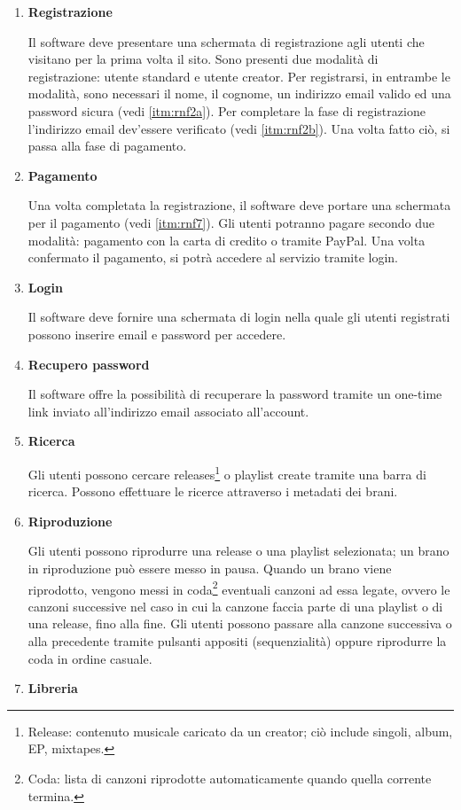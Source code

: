 \documentclass[a4paper,12pt]{article}
\begin{document}
\begin{enumerate}[label=\textbf{RF\arabic*}\;, ref=\textbf{RF\arabic*}]
    \item \label{itm:rf1} \textbf{Registrazione}
    
    Il software deve presentare una schermata di registrazione agli utenti che visitano per la prima volta il sito. Sono presenti due modalità di registrazione: utente standard e utente creator. Per registrarsi, in entrambe le modalità, sono necessari il nome, il cognome, un indirizzo email valido ed una password sicura (vedi \ref{itm:rnf2a}). Per completare la fase di registrazione l'indirizzo email dev'essere verificato (vedi \ref{itm:rnf2b}). Una volta fatto ciò, si passa alla fase di pagamento.
    \item \label{itm:rf2} \textbf{Pagamento}
    
    Una volta completata la registrazione, il software deve portare una schermata per il pagamento (vedi \ref{itm:rnf7}). Gli utenti potranno pagare secondo due modalità: pagamento con la carta di credito o tramite PayPal. Una volta confermato il pagamento, si potrà accedere al servizio tramite login.
    \item \label{itm:rf3} \textbf{Login}
    
    Il software deve fornire una schermata di login nella quale gli utenti registrati possono inserire email e password per accedere.
    \item \label{itm:rf4} \textbf{Recupero password}
    
    Il software offre la possibilità di recuperare la password tramite un one-time link inviato all’indirizzo email associato all’account.
    \item \label{itm:rf5} \textbf{Ricerca}
    
    Gli utenti possono cercare releases\footnote{Release: contenuto musicale caricato da un creator; ciò include singoli, album, EP, mixtapes.} o playlist create tramite una barra di ricerca. Possono effettuare le ricerce attraverso i metadati dei brani.
    \item \label{itm:rf6} \textbf{Riproduzione}
    
    Gli utenti possono riprodurre una release o una playlist selezionata; un brano in riproduzione può essere messo in pausa. Quando un brano viene riprodotto, vengono messi in coda\footnote{Coda: lista di canzoni riprodotte automaticamente quando quella corrente termina.} eventuali canzoni ad essa legate, ovvero le canzoni successive nel caso in cui la canzone faccia parte di una playlist o di una release, fino alla fine. Gli utenti possono passare alla canzone successiva o alla precedente tramite pulsanti appositi (sequenzialità) oppure riprodurre la coda in ordine casuale.
    \item \label{itm:rf7} \textbf{Libreria}


\end{enumerate}
\end{document}
